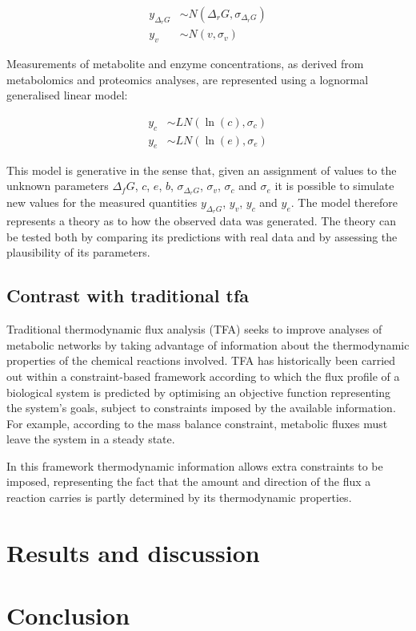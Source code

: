 \documentclass[11pt]{article}
\begin{document}
\begin{align*}
	y_{\Delta_rG} &\sim N(\Delta_rG, \sigma_{\Delta_rG}) \\
	y_{v} &\sim N(v, \sigma_{v})
\end{align*}

Measurements of metabolite and enzyme concentrations, as derived from
metabolomics and proteomics analyses, are represented using a lognormal
generalised linear model:

\begin{align*}
	y_{c} & \sim LN(\ln(c), \sigma_{c}) \\
	y_{e} & \sim LN(\ln(e), \sigma_{e})
\end{align*}

This model is generative in the sense that, given an assignment of values to
the unknown parameters $\Delta_fG$, $c$, $e$, $b$, $\sigma_{\Delta_rG}$,
$\sigma_{v}$, $\sigma_c$ and $\sigma_{e}$ it is possible to simulate new values
for the measured quantities $y_{\Delta_rG}$, $y_v$, $y_c$ and $y_e$. The model
therefore represents a theory as to how the observed data was generated. The
theory can be tested both by comparing its predictions with real data and by
assessing the plausibility of its parameters.

\subsection{Contrast with traditional tfa}

Traditional thermodynamic flux analysis (TFA) seeks to improve analyses of
metabolic networks by taking advantage of information about the thermodynamic
properties of the chemical reactions involved. TFA has historically been
carried out within a constraint-based framework according to which the flux
profile of a biological system is predicted by optimising an objective function
representing the system's goals, subject to constraints imposed by the
available information. For example, according to the mass balance constraint,
metabolic fluxes must leave the system in a steady state.

In this framework thermodynamic information allows extra constraints to be
imposed, representing the fact that the amount and direction of the flux a
reaction carries is partly determined by its thermodynamic properties.

\section{Results and discussion}


\section{Conclusion}

\printbibliography
\end{document}
